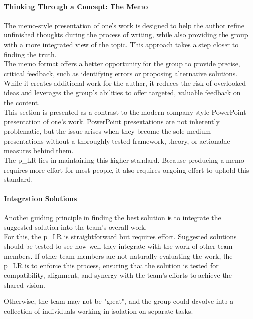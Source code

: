 \paragraph{Thinking Through a Concept: The Memo}

The memo-style presentation of one’s work is designed to help the author refine unfinished thoughts during the process of writing, while also providing the group with a more integrated view of the topic. This approach takes a step closer to finding the truth.\\

The memo format offers a better opportunity for the group to provide precise, critical feedback, such as identifying errors or proposing alternative solutions. While it creates additional work for the author, it reduces the risk of overlooked ideas and leverages the group's abilities to offer targeted, valuable feedback on the content.\\

This section is presented as a contrast to the modern company-style PowerPoint presentation of one’s work. PowerPoint presentations are not inherently problematic, but the issue arises when they become the sole medium—presentations without a thoroughly tested framework, theory, or actionable measures behind them.\\

The \gls{p_LR} lies in maintaining this higher standard. Because producing a memo requires more effort for most people, it also requires ongoing effort to uphold this standard. 

\paragraph{Integration Solutions}

Another guiding principle in finding the best solution is to integrate the suggested solution into the team's overall work.\\

For this, the \gls{p_LR} is straightforward but requires effort. Suggested solutions should be tested to see how well they integrate with the work of other team members. If other team members are not naturally evaluating the work, the \gls{p_LR} is to enforce this process, ensuring that the solution is tested for compatibility, alignment, and synergy with the team's efforts to achieve the shared vision. 

Otherwise, the team may not be "great", and the group could devolve into a collection of individuals working in isolation on separate tasks.

